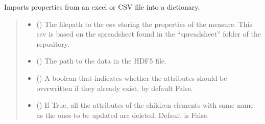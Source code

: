 \documentclass[letterpaper,10pt,english]{sphinxmanual}
\begin{document}
\begin{fulllineitems}
\begin{fulllineitems}
\label{\detokenize{_autosummary/HDF5_BLS.wrapper:HDF5_BLS.wrapper.Wrapper.import_properties_data}}
\pysigstartsignatures
\pysiglinewithargsret
{}
{\sphinxparamcomma {}\sphinxparamcomma {}\sphinxparamcomma {}}
{}
\pysigstopsignatures
\sphinxAtStartPar
Imports properties from an excel or CSV file into a dictionary.
\begin{quote}\begin{description}
\begin{itemize}
\item {} 
\sphinxAtStartPar
{} () \textendash{} The filepath to the csv storing the properties of the measure. This csv is based on the spreadsheet found in the “spreadsheet” folder of the repository.

\item {} 
\sphinxAtStartPar
{} () \textendash{} The path to the data in the HDF5 file.

\item {} 
\sphinxAtStartPar
{} (\sphinxstyleliteralemphasis{\sphinxupquote{, }}) \textendash{} A boolean that indicates whether the attributes should be overwritten if they already exist, by default False.

\item {} 
\sphinxAtStartPar
{} (\sphinxstyleliteralemphasis{\sphinxupquote{, }}) \textendash{} If True, all the attributes of the children elements with same name as the ones to be updated are deleted. Default is False.

\end{itemize}

\end{description}\end{quote}


\end{fulllineitems}
\end{fulllineitems}
\end{document}
